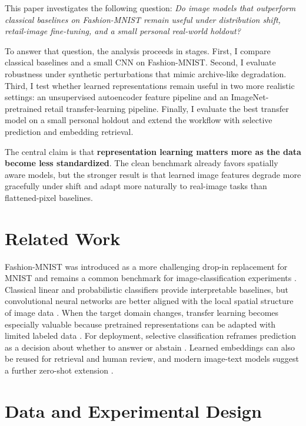 \documentclass[11pt]{article}
\begin{document}
This paper investigates the following question: \emph{Do image models that outperform classical baselines on Fashion-MNIST remain useful under distribution shift, retail-image fine-tuning, and a small personal real-world holdout?}

To answer that question, the analysis proceeds in stages. First, I compare classical baselines and a small CNN on Fashion-MNIST. Second, I evaluate robustness under synthetic perturbations that mimic archive-like degradation. Third, I test whether learned representations remain useful in two more realistic settings: an unsupervised autoencoder feature pipeline and an ImageNet-pretrained retail transfer-learning pipeline. Finally, I evaluate the best transfer model on a small personal holdout and extend the workflow with selective prediction and embedding retrieval.

The central claim is that \textbf{representation learning matters more as the data become less standardized}. The clean benchmark already favors spatially aware models, but the stronger result is that learned image features degrade more gracefully under shift and adapt more naturally to real-image tasks than flattened-pixel baselines.

\section{Related Work}

Fashion-MNIST was introduced as a more challenging drop-in replacement for MNIST and remains a common benchmark for image-classification experiments \cite{xiao2017fashion}. Classical linear and probabilistic classifiers provide interpretable baselines, but convolutional neural networks are better aligned with the local spatial structure of image data \cite{lecun1998gradient}. When the target domain changes, transfer learning becomes especially valuable because pretrained representations can be adapted with limited labeled data \cite{yosinski2014transferable,russakovsky2015imagenet,he2016resnet,howard2019mobilenetv3}. For deployment, selective classification reframes prediction as a decision about whether to answer or abstain \cite{geifman2017selective}. Learned embeddings can also be reused for retrieval and human review, and modern image-text models suggest a further zero-shot extension \cite{radford2021clip}.

\section{Data and Experimental Design}
\end{document}
